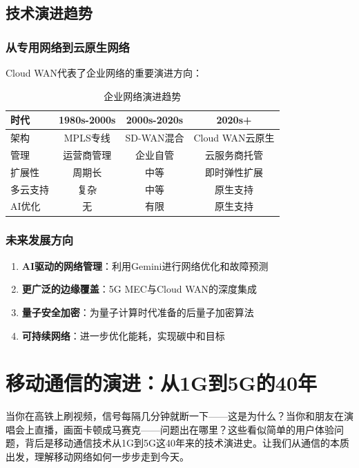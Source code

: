 \subsection{技术演进趋势}

\subsubsection{从专用网络到云原生网络}

Cloud WAN代表了企业网络的重要演进方向：

\begin{table}[htbp]
\centering
\caption{企业网络演进趋势}
\begin{tabular}{|l|c|c|c|}
\hline
\textbf{时代} & \textbf{1980s-2000s} & \textbf{2000s-2020s} & \textbf{2020s+} \\
\hline
架构 & MPLS专线 & SD-WAN混合 & Cloud WAN云原生 \\
管理 & 运营商管理 & 企业自管 & 云服务商托管 \\
扩展性 & 周期长 & 中等 & 即时弹性扩展 \\
多云支持 & 复杂 & 中等 & 原生支持 \\
AI优化 & 无 & 有限 & 原生支持 \\
\hline
\end{tabular}
\end{table}

\subsubsection{未来发展方向}

\begin{enumerate}
    \item \textbf{AI驱动的网络管理}：利用Gemini进行网络优化和故障预测
    \item \textbf{更广泛的边缘覆盖}：5G MEC与Cloud WAN的深度集成
    \item \textbf{量子安全加密}：为量子计算时代准备的后量子加密算法
    \item \textbf{可持续网络}：进一步优化能耗，实现碳中和目标
\end{enumerate}

\section{移动通信的演进：从1G到5G的40年}

当你在高铁上刷视频，信号每隔几分钟就断一下——这是为什么？当你和朋友在演唱会上直播，画面卡顿成马赛克——问题出在哪里？这些看似简单的用户体验问题，背后是移动通信技术从1G到5G这40年来的技术演进史。让我们从通信的本质出发，理解移动网络如何一步步走到今天。


